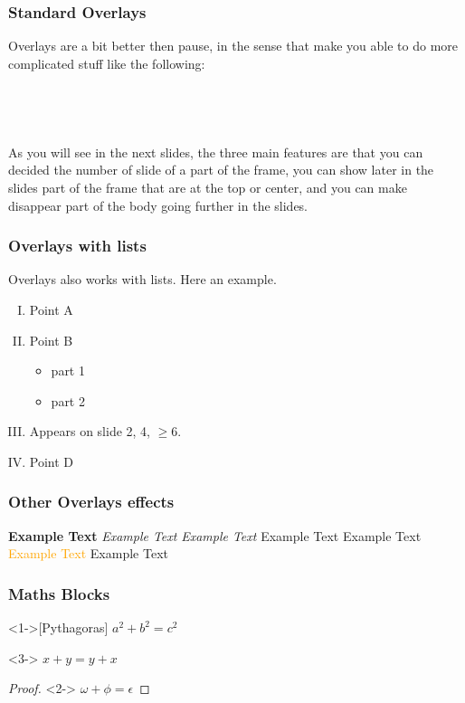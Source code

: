 \begin{frame}
    \frametitle{Standard Overlays}
    Overlays are a bit better then pause, in the sense that make you able to do more complicated stuff like the following:\\
    \\
    \\
    \\
    \\
    As you will see in the next slides, the three main features are that you can decided the number of slide of a part of the frame,  you can show later in the slides part of the frame that are at the top or center, and you can make disappear part of the body going further in the slides.
\end{frame}

\begin{frame}
    \frametitle{Overlays with lists}
    Overlays also works with lists.
    Here an example.
    \begin{enumerate}[(I)]
        \item<1-> Point A
        \item<2-> Point B
        \begin{itemize}
            \item<3-> part 1
            \item<4-> part 2
        \end{itemize}
        \item<2,4,6-> Appears on slide 2, 4, $\geq$6.
        \item<5-> Point D
    \end{enumerate}
\end{frame}



\begin{frame}
    \frametitle{Other Overlays effects}
    \textbf<2>{Example Text}
    \textit<2>{Example Text}
    \textsl<2>{Example Text}
    \textrm<2>{Example Text}
    \textsf<2>{Example Text}
    \textcolor<2>{orange}{Example Text}
    \alert<2>{Example Text}
\end{frame}

\begin{frame}
    \frametitle{Maths Blocks}
    \begin{theorem}<1->[Pythagoras] 
        $ a^2 + b^2 = c^2$
    \end{theorem}
    \begin{corollary}<3->
        $ x + y = y + x  $
    \end{corollary}
    \begin{proof}<2->
        $\omega +\phi = \epsilon $
    \end{proof}
\end{frame}


